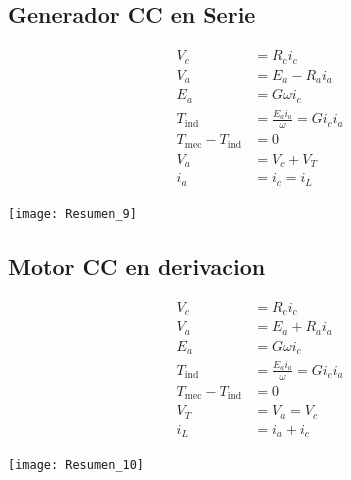 \documentclass[
  11pt,
  letterpaper,
   addpoints,
   answers
  ]{exam}
\begin{document}
\subsection*{Generador CC en Serie}
\begin{minipage}{0.6\textwidth} %
    \begin{align*}
        V_c &= R_c i_c \\
        V_a &= E_a - R_a i_a \\
        E_a &= G \omega i_c \\
        T_{\text{ind}} &= \frac{E_a i_a}{\omega} = G i_c i_a \\
        T_{\text{mec}} - T_{\text{ind}} &= 0 \\
        V_a &= V_c + V_T \\
        i_a &= i_c = i_L
    \end{align*}
\end{minipage}%
\hfill
\begin{minipage}{0.35\textwidth} %
    \centering
    \texttt{[image: Resumen\_9]} %
\end{minipage}
\vspace{1cm} 

\subsection*{Motor CC en derivacion}
\begin{minipage}{0.6\textwidth} %
    \begin{align*}
        V_c &= R_c i_c \\
        V_a &= E_a + R_a i_a \\
        E_a &= G \omega i_c \\
        T_{\text{ind}} &= \frac{E_a i_a}{\omega} = G i_c i_a \\
        T_{\text{mec}} - T_{\text{ind}} &= 0 \\
        V_T &= V_a = V_c \\
        i_L &= i_a + i_c
    \end{align*}
\end{minipage}%
\hfill
\begin{minipage}{0.35\textwidth} %
    \centering
    \texttt{[image: Resumen\_10]} %
\end{minipage}
\end{document}
